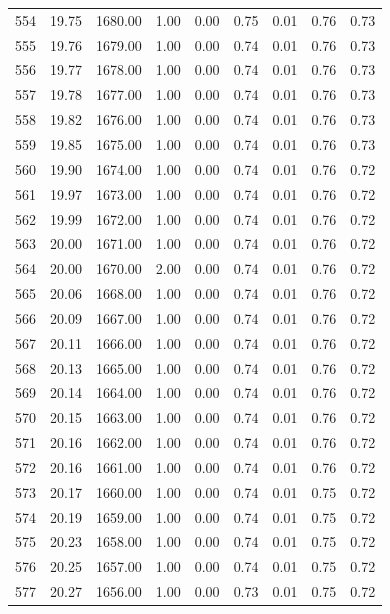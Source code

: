 \documentclass{article}\usepackage[]{graphicx}\usepackage[]{color}
\begin{document}
\begin{longtable}{rrrrrrrrr}
  554 & 19.75 & 1680.00 & 1.00 & 0.00 & 0.75 & 0.01 & 0.76 & 0.73 \\ 
  555 & 19.76 & 1679.00 & 1.00 & 0.00 & 0.74 & 0.01 & 0.76 & 0.73 \\ 
  556 & 19.77 & 1678.00 & 1.00 & 0.00 & 0.74 & 0.01 & 0.76 & 0.73 \\ 
  557 & 19.78 & 1677.00 & 1.00 & 0.00 & 0.74 & 0.01 & 0.76 & 0.73 \\ 
  558 & 19.82 & 1676.00 & 1.00 & 0.00 & 0.74 & 0.01 & 0.76 & 0.73 \\ 
  559 & 19.85 & 1675.00 & 1.00 & 0.00 & 0.74 & 0.01 & 0.76 & 0.73 \\ 
  560 & 19.90 & 1674.00 & 1.00 & 0.00 & 0.74 & 0.01 & 0.76 & 0.72 \\ 
  561 & 19.97 & 1673.00 & 1.00 & 0.00 & 0.74 & 0.01 & 0.76 & 0.72 \\ 
  562 & 19.99 & 1672.00 & 1.00 & 0.00 & 0.74 & 0.01 & 0.76 & 0.72 \\ 
  563 & 20.00 & 1671.00 & 1.00 & 0.00 & 0.74 & 0.01 & 0.76 & 0.72 \\ 
  564 & 20.00 & 1670.00 & 2.00 & 0.00 & 0.74 & 0.01 & 0.76 & 0.72 \\ 
  565 & 20.06 & 1668.00 & 1.00 & 0.00 & 0.74 & 0.01 & 0.76 & 0.72 \\ 
  566 & 20.09 & 1667.00 & 1.00 & 0.00 & 0.74 & 0.01 & 0.76 & 0.72 \\ 
  567 & 20.11 & 1666.00 & 1.00 & 0.00 & 0.74 & 0.01 & 0.76 & 0.72 \\ 
  568 & 20.13 & 1665.00 & 1.00 & 0.00 & 0.74 & 0.01 & 0.76 & 0.72 \\ 
  569 & 20.14 & 1664.00 & 1.00 & 0.00 & 0.74 & 0.01 & 0.76 & 0.72 \\ 
  570 & 20.15 & 1663.00 & 1.00 & 0.00 & 0.74 & 0.01 & 0.76 & 0.72 \\ 
  571 & 20.16 & 1662.00 & 1.00 & 0.00 & 0.74 & 0.01 & 0.76 & 0.72 \\ 
  572 & 20.16 & 1661.00 & 1.00 & 0.00 & 0.74 & 0.01 & 0.76 & 0.72 \\ 
  573 & 20.17 & 1660.00 & 1.00 & 0.00 & 0.74 & 0.01 & 0.75 & 0.72 \\ 
  574 & 20.19 & 1659.00 & 1.00 & 0.00 & 0.74 & 0.01 & 0.75 & 0.72 \\ 
  575 & 20.23 & 1658.00 & 1.00 & 0.00 & 0.74 & 0.01 & 0.75 & 0.72 \\ 
  576 & 20.25 & 1657.00 & 1.00 & 0.00 & 0.74 & 0.01 & 0.75 & 0.72 \\ 
  577 & 20.27 & 1656.00 & 1.00 & 0.00 & 0.73 & 0.01 & 0.75 & 0.72 \\ 

\end{longtable}
\end{document}
